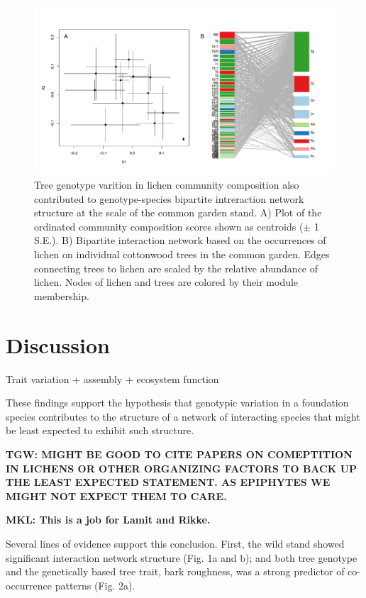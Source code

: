 \documentclass[fleqn,10pt]{wlscirep}
\begin{document}
\begin{figure}
\centering
\includegraphics[width = \textwidth]{lcn_com_bpnet.pdf}
\caption{Tree genotype varition in lichen community composition also
  contributed to genotype-species bipartite intreraction network
  structure at the scale of the common garden stand. A) Plot of the
  ordinated community composition scores shown as centroids ($\pm$ 1
  S.E.). B) Bipartite interaction network based on the occurrences of
  lichen on individual cottonwood trees in the common garden. Edges
  connecting trees to lichen are scaled by the relative abundance of
  lichen. Nodes of lichen and trees are colored by their module
  membership.}
\label{fig:bpnet}
\end{figure}



\clearpage
\newpage


\section*{Discussion}

Trait variation + assembly + ecosystem function

These findings support the hypothesis that genotypic variation in a
foundation species contributes to the structure of a network of
interacting species that might be least expected to exhibit such
structure. 

\textbf{TGW: MIGHT BE GOOD TO CITE PAPERS ON COMEPTITION IN LICHENS OR
OTHER ORGANIZING FACTORS TO BACK UP THE LEAST EXPECTED STATEMENT.  AS
EPIPHYTES WE MIGHT NOT EXPECT THEM TO CARE.}

\textbf{MKL: This is a job for Lamit and Rikke.}

Several lines of evidence support this conclusion. First, the wild
stand showed significant interaction network structure (Fig. 1a and
b); and both tree genotype and the genetically based tree trait, bark
roughness, was a strong predictor of co-occurrence patterns
(Fig. 2a). 
\end{document}
